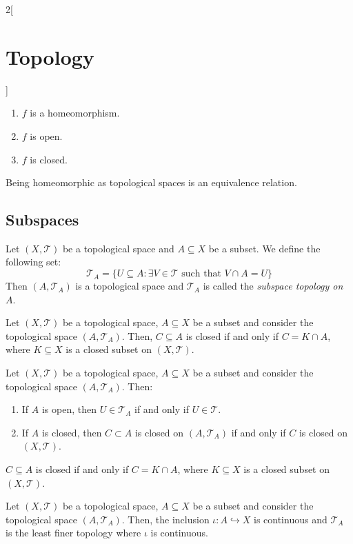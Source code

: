 \documentclass[../../../main.tex]{subfiles}
\begin{document}
\begin{multicols}{2}[\section{Topology}]
\begin{prop}
    \begin{enumerate}
      \item $f$ is a homeomorphism.
      \item $f$ is open.
      \item $f$ is closed.
    \end{enumerate}
  \end{prop}
  \begin{prop}
    Being homeomorphic as topological spaces is an equivalence relation.
  \end{prop}
  \subsection{Subspaces}
  \begin{definition}
    Let $(X,\mathcal{T})$ be a topological space and $A\subseteq X$ be a subset. We define the following set: $$\mathcal{T}_A=\{U\subseteq A:\exists V\in\mathcal{T}\text{ such that }V\cap A=U\}$$ Then $(A,\mathcal{T}_A)$ is a topological space and $\mathcal{T}_A$ is called the \textit{subspace topology on $A$}.
  \end{definition}
  \begin{prop}
    Let $(X,\mathcal{T})$ be a topological space, $A\subseteq X$ be a subset and consider the topological space $(A,\mathcal{T}_A)$. Then, $C\subseteq A$ is closed if and only if $C=K\cap A$, where $K\subseteq X$ is a closed subset on $(X,\mathcal{T})$.
  \end{prop}
  \begin{prop}
    Let $(X,\mathcal{T})$ be a topological space, $A\subseteq X$ be a subset and consider the topological space $(A,\mathcal{T}_A)$. Then:
    \begin{enumerate}
      \item If $A$ is open, then $U\in\mathcal{T}_A$ if and only if $U\in\mathcal{T}$.
      \item If $A$ is closed, then $C\subset A$ is closed on $(A,\mathcal{T}_A)$ if and only if $C$ is closed on $(X,\mathcal{T})$.
    \end{enumerate}
    $C\subseteq A$ is closed if and only if $C=K\cap A$, where $K\subseteq X$ is a closed subset on $(X,\mathcal{T})$.
  \end{prop}
  \begin{prop}
    Let $(X,\mathcal{T})$ be a topological space, $A\subseteq X$ be a subset and consider the topological space $(A,\mathcal{T}_A)$. Then, the inclusion $\iota:A\hookrightarrow X$ is continuous and $\mathcal{T}_A$ is the least finer topology where $\iota$ is continuous.

\end{prop}
\end{multicols}
\end{document}
